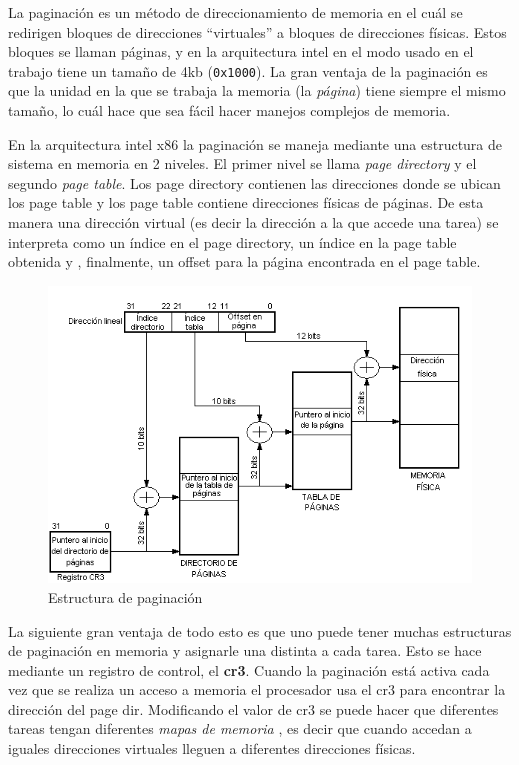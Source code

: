 	La paginación es un método de direccionamiento de memoria
en el cuál se redirigen bloques de direcciones ``virtuales''
a bloques de direcciones físicas. Estos bloques se llaman páginas, y
en la arquitectura intel en el modo usado en el trabajo tiene
un tamaño de 4kb (\texttt{0x1000}). La gran ventaja de la paginación
es que la unidad en la que se trabaja la memoria (la \textit{página})
tiene siempre el mismo tamaño, lo cuál hace que sea fácil hacer manejos
complejos de memoria.

	En la arquitectura intel x86 la paginación se maneja mediante
una estructura de sistema en memoria en 2 niveles. El primer nivel se llama
\textit{page directory} y el segundo \textit{page table}. Los page directory
contienen las direcciones donde se ubican los page table y los page
table contiene direcciones físicas de páginas. De esta manera una dirección
virtual (es decir la dirección a la que accede una tarea) se interpreta
como un índice en el page directory, un índice en la page table obtenida y
, finalmente, un offset para la página encontrada en el page table.

\begin{figure}[h]
\begin{center}
  \includegraphics[scale=0.7]{secciones/dibujitos/mmu.png}
\end{center}
\caption{Estructura de paginaci\'on}
\end{figure}

	La siguiente gran ventaja de todo esto es que uno puede tener muchas
estructuras de paginación en memoria y asignarle una distinta a cada tarea.
Esto se hace mediante un registro de control, el \textbf{cr3}. Cuando la
paginación está activa cada vez que se realiza un acceso a memoria
el procesador usa el cr3 para encontrar la dirección del page dir. Modificando
el valor de cr3 se puede hacer que diferentes tareas tengan diferentes \textit{mapas de memoria}
, es decir que cuando accedan a iguales direcciones virtuales lleguen a
diferentes direcciones físicas.


